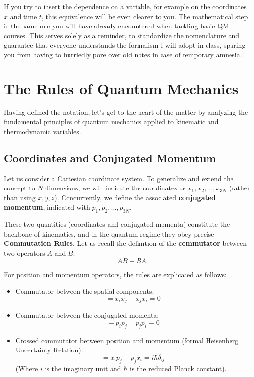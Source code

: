 If you try to insert the dependence on a variable, for example on the coordinates $x$ and time $t$, this equivalence will be even clearer to you. The mathematical step is the same one you will have already encountered when tackling basic QM courses. This serves solely as a reminder, to standardize the nomenclature and guarantee that everyone understands the formalism I will adopt in class, sparing you from having to hurriedly pore over old notes in case of temporary amnesia.

\section{The Rules of Quantum Mechanics}

Having defined the notation, let's get to the heart of the matter by analyzing the fundamental principles of quantum mechanics applied to kinematic and thermodynamic variables.

\subsection{Coordinates and Conjugated Momentum}

Let us consider a Cartesian coordinate system. To generalize and extend the concept to $N$ dimensions, we will indicate the coordinates as $x_1, x_2, \ldots, x_{3N}$ (rather than using $x, y, z$).
Concurrently, we define the associated \textbf{conjugated momentum}, indicated with $p_1, p_2, \ldots, p_{3N}$.

These two quantities (coordinates and conjugated momenta) constitute the backbone of kinematics, and in the quantum regime they obey precise \textbf{Commutation Rules}. Let us recall the definition of the \textbf{commutator} between two operators $A$ and $B$:
\begin{equation}
[A, B] = AB - BA
\end{equation}

For position and momentum operators, the rules are explicated as follows:
\begin{itemize}
\item Commutator between the spatial components:
\begin{equation}
[x_i, x_j] = x_i x_j - x_j x_i = 0
\end{equation}
\item Commutator between the conjugated momenta:
\begin{equation}
[p_i, p_j] = p_i p_j - p_j p_i = 0
\end{equation}
\item Crossed commutator between position and momentum (formal Heisenberg Uncertainty Relation):
\begin{equation}
[x_i, p_j] = x_i p_j - p_j x_i = i \hbar \delta_{ij}
\end{equation}
(Where $i$ is the imaginary unit and $\hbar$ is the reduced Planck constant).
\end{itemize}

